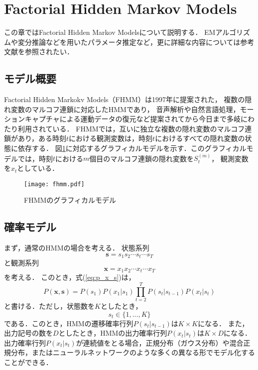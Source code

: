 \newpage
\section{Factorial Hidden Markov Models}

この章ではFactorial Hidden Markov Modelsについて説明する．
EMアルゴリズムや変分推論\cite{variational_method}などを用いたパラメータ推定など，更に詳細な内容については参考文献\cite{fhmm}を参照されたい．

\subsection{モデル概要}
Factorial Hidden Markokv Models（FHMM）\cite{fhmm}は1997年に提案された，
複数の隠れ変数のマルコフ連鎖に対応したHMMであり，
音声解析や自然言語処理，モーションキャプチャによる運動データの復元など提案されてから今日まで多岐にわたり利用されている\cite{s_f_fhmm, Logan97factorialhidden, Dongheui2008missing, NepalY13}．
FHMMでは，互いに独立な複数の隠れ変数のマルコフ連鎖があり，ある時刻$t$における観測変数は，時刻$t$におけるすべての隠れ変数の状態に依存する．
図\ref{fig:fhmm}に対応するグラフィカルモデルを示す．このグラフィカルモデルでは，時刻$t$における$m$個目のマルコフ連鎖の隠れ変数を$S^{(m)}_{t}$，
観測変数を$x_{t}$としている．

\begin{figure}[t]
  \centering \texttt{[image: fhmm.pdf]}
  \caption{FHMMのグラフィカルモデル}
  \label{fig:fhmm}
\end{figure}

\subsection{確率モデル}
まず，通常のHMMの場合を考える．
状態系列
\begin{equation}
  \mathbf{s} = s_{1}s_{2}\cdots s_{t} \cdots s_{T}
\end{equation}
と観測系列
\begin{equation}
  \mathbf{x} = x_{1}x_{2}\cdots x_{t} \cdots x_{T}
\end{equation}
を考える．
このとき，式(\ref{eq:p_x_s})は，
\begin{equation}
  P(\mathbf{x}, \mathbf{s}) = P(s_{1}) P(x_{1} | s_{1}) \prod_{t=2}^{T} P(s_{t} | s_{t-1}) P(x_{t} | s_{t})
\end{equation}
と書ける．ただし，状態数を$K$としたとき，
\begin{equation}
  s_{t} \in \{1, ..., K\}
\end{equation}
である．このとき，HMMの遷移確率行列$P(s_{t} | s_{t-1})$は$K \times K$になる．
また，出力記号の数を$D$としたとき，HMMの出力確率行列$P(x_{t} | s_{t})$は$K \times D$になる．
出力確率行列$P(x_{t} | s_{t})$が連続値をとる場合，正規分布（ガウス分布）や混合正規分布，またはニューラルネットワークのような多くの異なる形でモデル化することができる．


